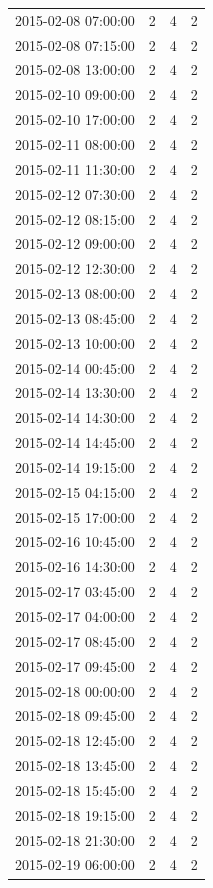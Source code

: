 \begin{tabular}{lrrr}
2015-02-08 07:00:00 & 2 & 4 & 2 \\
2015-02-08 07:15:00 & 2 & 4 & 2 \\
2015-02-08 13:00:00 & 2 & 4 & 2 \\
2015-02-10 09:00:00 & 2 & 4 & 2 \\
2015-02-10 17:00:00 & 2 & 4 & 2 \\
2015-02-11 08:00:00 & 2 & 4 & 2 \\
2015-02-11 11:30:00 & 2 & 4 & 2 \\
2015-02-12 07:30:00 & 2 & 4 & 2 \\
2015-02-12 08:15:00 & 2 & 4 & 2 \\
2015-02-12 09:00:00 & 2 & 4 & 2 \\
2015-02-12 12:30:00 & 2 & 4 & 2 \\
2015-02-13 08:00:00 & 2 & 4 & 2 \\
2015-02-13 08:45:00 & 2 & 4 & 2 \\
2015-02-13 10:00:00 & 2 & 4 & 2 \\
2015-02-14 00:45:00 & 2 & 4 & 2 \\
2015-02-14 13:30:00 & 2 & 4 & 2 \\
2015-02-14 14:30:00 & 2 & 4 & 2 \\
2015-02-14 14:45:00 & 2 & 4 & 2 \\
2015-02-14 19:15:00 & 2 & 4 & 2 \\
2015-02-15 04:15:00 & 2 & 4 & 2 \\
2015-02-15 17:00:00 & 2 & 4 & 2 \\
2015-02-16 10:45:00 & 2 & 4 & 2 \\
2015-02-16 14:30:00 & 2 & 4 & 2 \\
2015-02-17 03:45:00 & 2 & 4 & 2 \\
2015-02-17 04:00:00 & 2 & 4 & 2 \\
2015-02-17 08:45:00 & 2 & 4 & 2 \\
2015-02-17 09:45:00 & 2 & 4 & 2 \\
2015-02-18 00:00:00 & 2 & 4 & 2 \\
2015-02-18 09:45:00 & 2 & 4 & 2 \\
2015-02-18 12:45:00 & 2 & 4 & 2 \\
2015-02-18 13:45:00 & 2 & 4 & 2 \\
2015-02-18 15:45:00 & 2 & 4 & 2 \\
2015-02-18 19:15:00 & 2 & 4 & 2 \\
2015-02-18 21:30:00 & 2 & 4 & 2 \\
2015-02-19 06:00:00 & 2 & 4 & 2 \\

\end{tabular}
